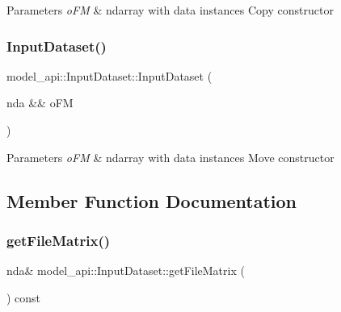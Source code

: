 \begin{DoxyParams}{Parameters}
{\em o\+FM} & ndarray with data instances Copy constructor \\
\hline
\end{DoxyParams}
\mbox{\label{classmodel__api_1_1InputDataset_a213885343387992b05a173ecb70a628f}} 
\subsubsection{\texorpdfstring{Input\+Dataset()}{InputDataset()}\hspace{0.1cm}{\footnotesize\ttfamily [2/2]}}
{\footnotesize\ttfamily model\+\_\+api\+::\+Input\+Dataset\+::\+Input\+Dataset (\begin{DoxyParamCaption}\item[{nda \&\&}]{o\+FM }\end{DoxyParamCaption})}


\begin{DoxyParams}{Parameters}
{\em o\+FM} & ndarray with data instances Move constructor \\
\hline
\end{DoxyParams}


\subsection{Member Function Documentation}
\mbox{\label{classmodel__api_1_1InputDataset_a853b380f548e21ee7421f887b9be2722}} 
\subsubsection{\texorpdfstring{get\+File\+Matrix()}{getFileMatrix()}}
{\footnotesize\ttfamily nda\& model\+\_\+api\+::\+Input\+Dataset\+::get\+File\+Matrix (\begin{DoxyParamCaption}{ }\end{DoxyParamCaption}) const\hspace{0.3cm}{\ttfamily [virtual]}}

